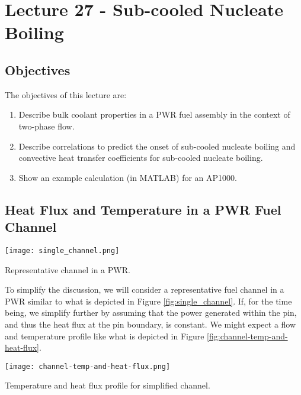 \chapter{Lecture 27 - Sub-cooled Nucleate Boiling}
\label{ch:ch27}
\section{Objectives}
The objectives of this lecture are:
\begin{enumerate}
\item Describe bulk coolant properties in a PWR fuel assembly in the context of two-phase flow.
\item Describe correlations to predict the onset of sub-cooled nucleate boiling and convective heat transfer coefficients for sub-cooled nucleate boiling.
\item Show an example calculation (in MATLAB) for an AP1000.
\end{enumerate}

\section{Heat Flux and Temperature in a PWR Fuel Channel}
\begin{marginfigure}
\texttt{[image: single\_channel.png]}
\caption{Representative channel in a PWR.}
\label{fig:single_channel}
\end{marginfigure}
To simplify the discussion, we will consider a representative fuel channel in a PWR similar to what is depicted in Figure \ref{fig:single_channel}.  If, for the time being, we simplify further by assuming that the power generated within the pin, and thus the heat flux at the pin boundary, is constant.  We might expect a flow and temperature profile like what is depicted in Figure \ref{fig:channel-temp-and-heat-flux}.

\begin{marginfigure}
\texttt{[image: channel-temp-and-heat-flux.png]}
\caption{Temperature and heat flux profile for simplified channel.}
\label{fig:channel-temp-and-heat-flux}
\end{marginfigure}

